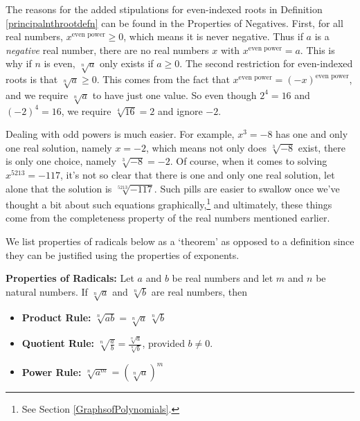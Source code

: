 \documentclass{ximera}
\begin{document}

\medskip

The reasons for the added stipulations for even-indexed roots in Definition \ref{principalnthrootdefn} can be found in the Properties of Negatives.  First, for all real numbers,  $x^{\text{even power}} \geq 0$, which means it is never negative.  Thus if $a$ is a \textit{negative} real number, there are no real numbers $x$ with $x^{\text{even power}} = a$.  This is why if $n$ is even, $\sqrt[n]{a}$ only exists if $a \geq 0$.  The second restriction for even-indexed roots is that $\sqrt[n]{a} \geq 0$.  This comes from the fact that $x^{\text{even power}} = (-x)^{\text{even power}}$, and we require $\sqrt[n]{a}$ to have just one value.  So even though $2^{4} = 16$ and $(-2)^{4} = 16$, we require $\sqrt[4]{16} = 2$ and ignore $-2$.  

\smallskip

Dealing with odd powers is much easier. For example, $x^3 = -8$ has one and only one real solution, namely $x = -2$, which means not only does $\sqrt[3]{-8}$ exist, there is only one choice, namely $\sqrt[3]{-8} = -2$. Of course, when it comes to solving $x^{5213} = -117$, it's not so clear that there is one and only one real solution, let alone that the solution is $\sqrt[5213]{-117}$. Such pills are easier to swallow once we've thought a bit about such equations graphically,\footnote{See Section \ref{GraphsofPolynomials}.} and ultimately, these things come from the completeness property of the real numbers mentioned earlier.  

\smallskip

We list properties of radicals below as a `theorem' as opposed to a definition since they can be justified using the properties of exponents.

\medskip

\begin{theorem}  \textbf{Properties of Radicals:} Let $a$ and $b$ be real numbers and let $m$ and $n$ be natural numbers.  If $\sqrt[n]{a}$ and $\sqrt[n]{b}$ are real numbers, then

\label{radicalprops}

\begin{itemize}

\item  \textbf{Product Rule:}  $\sqrt[n]{ab} = \sqrt[n]{a} \, \sqrt[n]{b}$ 

\item  \textbf{Quotient Rule:}  $\sqrt[n]{\frac{a}{b}} = \frac{\sqrt[n]{a}}{\sqrt[n]{b}}$, provided $b \neq 0$. 

\item  \textbf{Power Rule:} $\sqrt[n]{a^m} = \left(\sqrt[n]{a}\right)^m$ 

\end{itemize}

\end{theorem}
\end{document}
